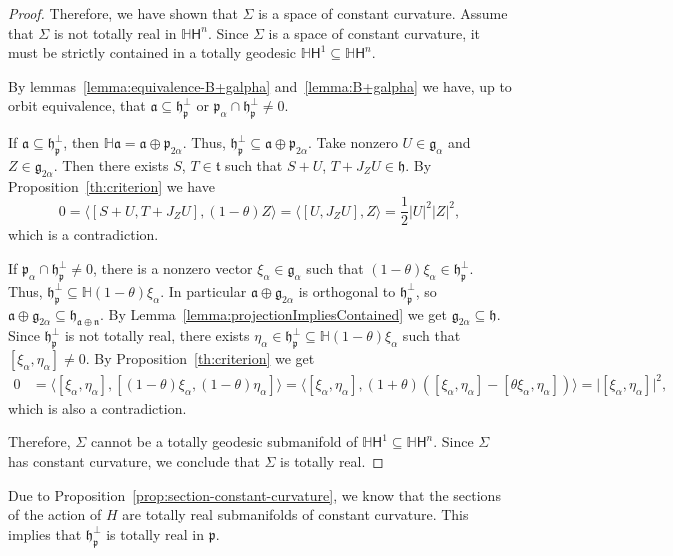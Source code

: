 \documentclass[12pt, a4paper]{amsart}
\newcommand{\g}{\mathfrak}
\newcommand{\s}{\mathsf}
\renewcommand{\H}{\mathbb{H}}
\theoremstyle{definition}
\begin{document}
\begin{proof}
Therefore, we have shown that $\Sigma$ is a space of constant curvature.
Assume that $\Sigma$ is not totally real in $\mathbb{H}\s{H}^n$.
Since $\Sigma$ is a space of constant curvature, 
it must be strictly contained in a totally geodesic $\mathbb{H}\s{H}^1\subseteq\mathbb{H}\s{H}^n$.

By lemmas~\ref{lemma:equivalence-B+galpha} and~\ref{lemma:B+galpha} we have, up to orbit equivalence, 
that $\g{a}\subseteq\g{h}_\g{p}^\perp$ or $\g{p}_\alpha\cap\g{h}_\g{p}^\perp\neq 0$.

If $\g{a}\subseteq\g{h}_\g{p}^\perp$, 
then $\mathbb{H}\g{a}=\g{a}\oplus\g{p}_{2\alpha}$.
Thus, $\g{h}_\g{p}^\perp\subseteq\g{a}\oplus\g{p}_{2\alpha}$.
Take nonzero $U\in\g{g}_\alpha$ and $Z\in\g{g}_{2\alpha}$.
Then there exists $S$, $T\in\g{t}$ such that $S+U$, $T+J_Z U\in\g{h}$.
By Proposition~\ref{th:criterion} we have
\[
0=\langle[S+U,T+J_Z U],(1-\theta)Z\rangle
=\langle [U,J_Z U],Z\rangle
=\frac{1}{2}\lvert U\rvert^2\lvert Z\rvert^2,
\]
which is a contradiction.

If $\g{p}_\alpha\cap\g{h}_\g{p}^\perp\neq 0$, there is a nonzero vector $\xi_\alpha\in\g{g}_\alpha$ such that
$(1-\theta)\xi_\alpha\in\g{h}_\g{p}^\perp$.
Thus, $\g{h}_\g{p}^\perp\subseteq\mathbb{H}(1-\theta)\xi_\alpha$.
In particular $\g{a}\oplus\g{g}_{2\alpha}$ is orthogonal to $\g{h}_\g{p}^\perp$, so $\g{a}\oplus\g{g}_{2\alpha}\subseteq\g{h}_{\g{a}\oplus\g{n}}$.
By Lemma~\ref{lemma:projectionImpliesContained} we get $\g{g}_{2\alpha}\subseteq\g{h}$.
Since $\g{h}_\g{p}^\perp$ is not totally real, 
there exists $\eta_\alpha\in\g{h}_\g{p}^\perp\subseteq\mathbb{H}(1-\theta)\xi_\alpha$ 
such that $[\xi_\alpha,\eta_\alpha]\neq 0$.
By Proposition~\ref{th:criterion} we get
\begin{align*}
0
&{}=\langle[\xi_\alpha,\eta_\alpha],[(1-\theta)\xi_\alpha,(1-\theta)\eta_\alpha]\rangle
=\langle[\xi_\alpha,\eta_\alpha],
(1+\theta)([\xi_\alpha,\eta_\alpha]-[\theta\xi_\alpha,\eta_\alpha])\rangle
=\lvert[\xi_\alpha,\eta_\alpha]\rvert^2,
\end{align*}
which is also a contradiction.

Therefore, $\Sigma$ cannot be a totally geodesic submanifold of 
$\H\s{H}^1\subseteq\H\s{H}^n$.
Since $\Sigma$ has constant curvature, we conclude that $\Sigma$ is totally real.
\end{proof}

Due to Proposition~\ref{prop:section-constant-curvature}, we know that the sections of the action
of $H$ are totally real submanifolds of constant curvature.
This implies that $\g{h}_{\g{p}}^\perp$ is totally real in $\g{p}$.
\end{document}
